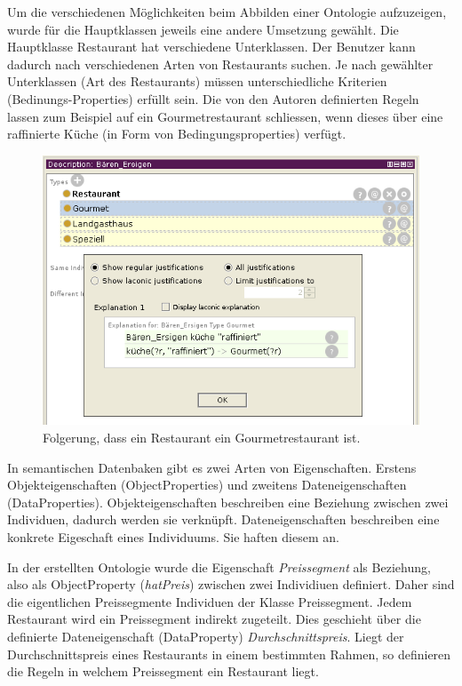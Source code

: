 Um die verschiedenen Möglichkeiten beim Abbilden einer Ontologie aufzuzeigen, wurde für die Hauptklassen jeweils eine andere Umsetzung gewählt. Die Hauptklasse Restaurant hat verschiedene Unterklassen. Der Benutzer kann dadurch nach verschiedenen Arten von Restaurants suchen. Je nach gewählter Unterklassen (Art des Restaurants) müssen unterschiedliche Kriterien (Bedinungs-Properties) erfüllt sein. Die von den Autoren definierten Regeln lassen zum Beispiel auf ein Gourmetrestaurant schliessen, wenn dieses über eine raffinierte Küche (in Form von Bedingungsproperties) verfügt.

\begin{figure}[H]%
    \centering
    \includegraphics[scale=0.7]{bilder/loesung_regeln.png}
    \caption{Folgerung, dass ein Restaurant ein Gourmetrestaurant ist.\label{fig:loesung:regeln}\protect\footnotemark}
\end{figure}

In semantischen Datenbaken gibt es zwei Arten von Eigenschaften. Erstens Objekteigenschaften (ObjectProperties) und zweitens Dateneigenschaften (DataProperties). Objekteigenschaften beschreiben eine Beziehung zwischen zwei Individuen, dadurch werden sie verknüpft. Dateneigenschaften beschreiben eine konkrete Eigeschaft eines Individuums. Sie haften diesem an.

In der erstellten Ontologie wurde die Eigenschaft \textit{Preissegment} als Beziehung, also als ObjectProperty (\textit{hatPreis}) zwischen zwei Individiuen definiert. Daher sind die eigentlichen Preissegmente Individuen der Klasse Preissegment. Jedem Restaurant wird ein Preissegment indirekt zugeteilt. Dies geschieht über die definierte Dateneigenschaft (DataProperty) \textit{Durchschnittspreis}. Liegt der Durchschnittspreis eines Restaurants in einem bestimmten Rahmen, so definieren die Regeln in welchem Preissegment ein Restaurant liegt.


